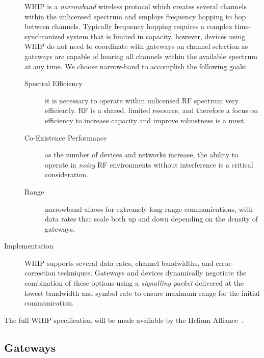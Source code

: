 \documentclass[letterpaper,11pt]{article}
\begin{document}
\begin{description}
        WHIP is a \emph{narrowband} wireless protocol which creates several channels within the unlicensed spectrum and employs frequency hopping to hop between channels. Typically frequency hopping requires a complex time-synchronized system that is limited in capacity, however, devices using WHIP do not need to coordinate with gateways on channel selection as gateways are capable of hearing all channels within the available spectrum at any time. We choose narrow-band to accomplish the following goals:

        \begin{description}
                \item[Spectral Efficiency] it is necessary to operate within unlicensed RF spectrum very efficiently. RF is a shared, limited resource, and therefore a focus on efficiency to increase capacity and improve robustness is a must.
                \item[Co-Existence Performance] as the number of devices and networks increase, the ability to operate in \emph{noisy} RF environments without interference is a critical consideration.
                \item[Range] narrowband allows for extremely long-range communications, with data rates that scale both up and down depending on the density of gateways.
        \end{description}

        \item [Implementation] WHIP supports several data rates, channel bandwidths, and error-correction techniques. Gateways and devices dynamically negotiate the combination of these options using a \emph{signalling packet} delivered at the lowest bandwidth and symbol rate to ensure maximum range for the initial communication.
\end{description}

The full WHIP specification will be made available by the Helium Alliance~\cite{alliance}.

\subsection{Gateways}\label{gateways}
\end{document}
